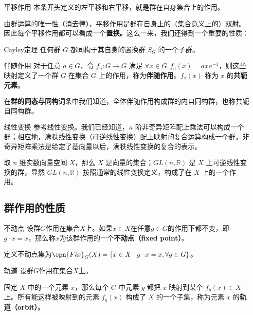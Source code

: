 \begin{example}{平移作用}\label{ex_Group3_1}
本条开头定义的左平移和右平移，就是群在自身集合上的作用。
\end{example}

由群运算的唯一性（消去律），平移作用是群在自身上的（集合意义上的）双射。因此每个平移作用都可以看成一个\textbf{置换。}这么一来，我们还得到一个重要的性质：

\begin{theorem}{Cayley定理}\label{the_Group3_3}
任何群 $G$ 都同构于其自身的置换群 $S_G$ 的一个子群。
\end{theorem}

\begin{example}{伴随作用}\label{ex_Group3_2}
对于任意 $a\in G$，令 $f_a: G\rightarrow G$ 满足 $\forall x\in G, f_a(x)=axa^{-1}$，则这些映射定义了一个群 $G$ 在集合 $G$ 上的作用，称为\textbf{伴随作用}。$f_a(x)$ 称为 $x$ 的\textbf{共轭元素}。

在\textbf{群的同态与同构}词条中我们知道，全体伴随作用构成群的内自同构群，也称共轭自同构群。
\end{example}

\begin{example}{线性变换}\label{ex_Group3_3}
参考线性变换。我们已经知道，$n$ 阶非奇异矩阵配上乘法可以构成一个群；相应地，满秩线性变换（可逆线性变换）配上映射的复合运算构成一个群。非奇异矩阵乘法是给定了基向量以后，满秩线性变换的复合的表示。

取 $n$ 维实数向量空间 $X$，那么 $X$ 是向量的集合；$GL(n,\mathbb{R})$ 是 $X$ 上可逆线性变换的群，显然 $GL(n,\mathbb{R})$ 按照通常的线性变换定义，构成了在 $X$ 上的一个作用。
\end{example}

\subsection{群作用的性质}


\begin{definition}{不动点}
设群$G$作用在集合$X$上。如果$x\in X$在任意$g\in G$的作用下都不变，即$g\cdot x=x$，那么称$x$为该群作用的一个\textbf{不动点（fixed point）}。

定义不动点集为$\opn{Fix}_G(X)=\{x\in X\mid g\cdot x=x, \forall g\in G\}$。
\end{definition}




\begin{definition}{轨道}
设群$G$作用在集合$X$上。

固定 $X$ 中的一个元素 $x$，那么每个 $G$ 中元素 $g$ 都把 $x$ 映射到某个 $f_g(x)\in X$ 上。所有能这样被映射到的元素 $f_g(x)$ 构成了 $X$ 的一个子集，称为元素 $x$ 的\textbf{轨道（orbit）}。
\end{definition}









